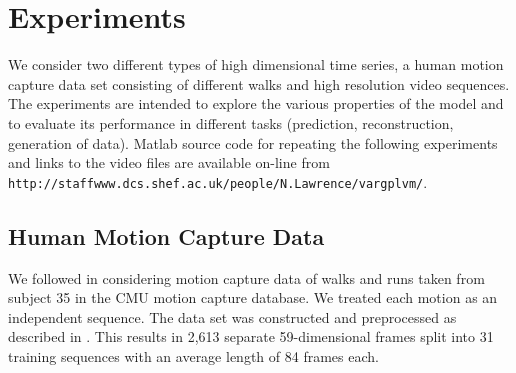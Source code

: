 \documentclass{article} %
\begin{document}
\section{Experiments}

We consider two different types of high dimensional time series, a
human motion capture data set consisting of different walks and high
resolution video sequences. The experiments are intended to explore
the various properties of the model and to evaluate its performance in
different tasks (prediction, reconstruction, generation of data). 
Matlab source code for repeating the following experiments and links to the 
video files are available
on-line from 
\verb|http://staffwww.dcs.shef.ac.uk/people/N.Lawrence/vargplvm/|.

\subsection{Human Motion Capture Data}

We followed \cite{Taylor,gplvmLarger} in considering motion capture
data of walks and runs taken from subject 35 in the CMU motion capture
database. We treated each motion as an independent sequence.  The data
set was constructed and preprocessed as described in
\cite{gplvmLarger}. This results in 2,613 separate 59-dimensional
frames split into 31 training sequences with an average length of 84
frames each.
\end{document}
